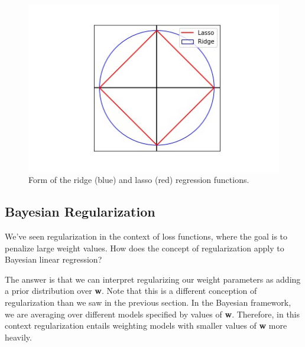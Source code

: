 \begin{figure}
    \centering
    \includegraphics[width=0.5\paperwidth]{../LinearRegression/fig/ridgeandlassoreg_GEN.jpg}
    \caption{Form of the ridge (blue) and lasso (red) regression functions.}
    \label{fig:ridge-and-lasso-reg-fn-form}
\end{figure}


\subsection{Bayesian Regularization} \label{bayesian-regularization-section}
We've seen regularization in the context of loss functions, where the goal is to penalize large weight values. How does the concept of regularization apply to Bayesian linear regression?

The answer is that we can interpret regularizing our weight parameters as adding a prior distribution over \textbf{w}. Note that this is a different conception of regularization than we saw in the previous section. In the Bayesian framework, we are averaging over different models specified by values of \textbf{w}. Therefore, in this context regularization entails weighting models with smaller values of \textbf{w} more heavily.

